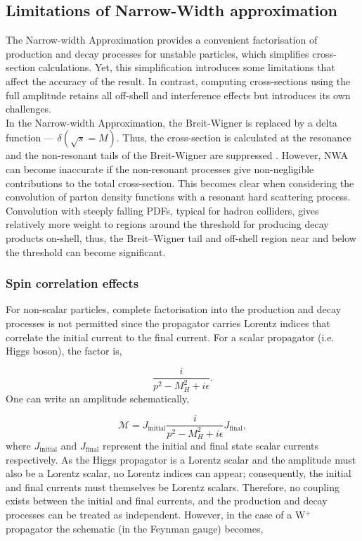 \documentclass[a4paper,11pt]{article}
\begin{document}
\subsection{Limitations of Narrow-Width approximation}
The Narrow-width Approximation provides a convenient factorisation of production and decay processes for unstable particles, which simplifies cross-section calculations. Yet, this simplification introduces some limitations that affect the accuracy of the result. In contrast, computing cross-sections using the full amplitude retains all off-shell and interference effects but introduces its own challenges.\\

In the Narrow-width Approximation, the Breit-Wigner is replaced by a delta function --- $\delta(\sqrt{s} = M)$. Thus, the cross-section is calculated at the resonance and the non-resonant tails of the Breit-Wigner are suppressed \cite{Fuchs:2014ola}. However, NWA can become inaccurate if the non-resonant processes give non-negligible contributions to the total cross-section. This becomes clear when considering the convolution of parton density functions with a resonant hard scattering process\cite{Uhlemann:2008pm}. Convolution with steeply falling PDFs, typical for hadron colliders, gives relatively more weight to regions around the threshold for producing decay products on-shell\cite{Kauer:2007zc}, thus, the Breit–Wigner tail and off-shell region near and below the threshold can become significant.\\
\subsubsection{Spin correlation effects}
For non-scalar particles, complete factorisation into the production and decay processes is not permitted since the propagator carries Lorentz indices that correlate the initial current to the final current\cite{Uhlemann:2008pm}. For a scalar propagator (i.e. Higgs boson), the factor is,

$$
\frac{i}{p^2 - M_H^2+i\epsilon}.
$$
One can write an amplitude schematically, 

$$
\mathcal{M} = J_{\text{initial}} \frac{i}{p^2 - M_H^2+i\epsilon} J_{\text{final}},
$$ 
where $J_{\text{initial}}$ and $J_{\text{final}}$ represent the initial and final state scalar currents respectively. As the Higgs propagator is a Lorentz scalar and the amplitude must also be a Lorentz scalar, no Lorentz indices can appear; consequently, the initial and final currents must themselves be Lorentz scalars. Therefore, no coupling exists between the initial and final currents, and the production and decay processes can be treated as independent. However, in the case of a W$^+$ propagator the schematic (in the Feynman gauge) becomes,
\end{document}
